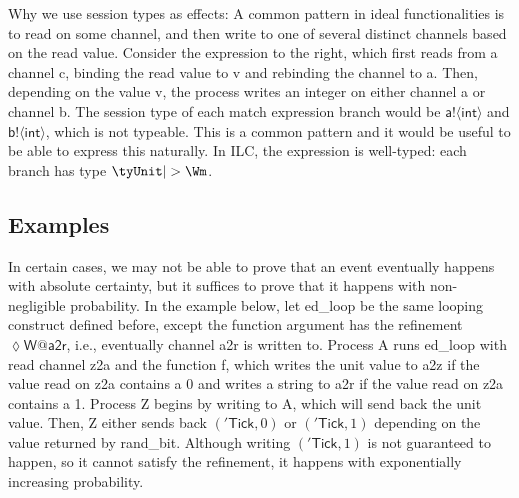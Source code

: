 Why we use session types as effects: A common pattern in ideal functionalities
is to read on some channel, and then write to one of several distinct channels
based on the read value. Consider the expression to the right, which first reads
from a channel \textsf{c}, binding the read value to \textsf{v} and rebinding
the channel to \textsf{a}. Then, depending on the value \textsf{v}, the process
writes an integer on either channel \textsf{a} or channel \textsf{b}. The
session type of each match expression branch would be
$\mathsf{a}!\langle\mathsf{int}\rangle$ and $\mathsf{b}!\langle\mathsf{int}\rangle$, which is not
typeable. This is a common pattern and it would be useful to be able to express
this naturally. In ILC, the expression is well-typed: each branch has type
$\tyUnit |> \Wm$.\mypar \endgroup


\subsection{Examples}
\label{subsec:examples}

In certain cases, we may not be able to prove that an event eventually happens
with absolute certainty, but it suffices to prove that it happens with
non-negligible probability. In the example below, let \textsf{ed\_loop} be the
same looping construct defined before, except the function argument has the
refinement $\lozenge \mathsf{W@a2r}$, i.e., eventually channel \textsf{a2r} is written
to. Process \textsf{A} runs \textsf{ed\_loop} with read channel \textsf{z2a} and
the function \textsf{f}, which writes the unit value to \textsf{a2z} if the value read
on \textsf{z2a} contains a 0 and writes a string to \textsf{a2r} if the value
read on \textsf{z2a} contains a 1. Process \textsf{Z} begins by writing to
\textsf{A}, which will send back the unit value. Then, \textsf{Z} either sends
back $(\mathsf{'Tick}, 0)$ or $(\mathsf{'Tick}, 1)$ depending on the value
returned by \textsf{rand\_bit}. Although writing $(\mathsf{'Tick}, 1)$ is not
guaranteed to happen, so it cannot satisfy the refinement, it happens with
exponentially increasing probability.



%

%

%
